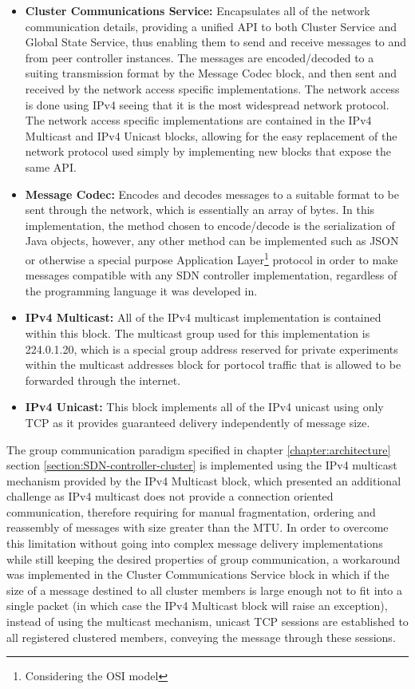 \begin{itemize}
	\item \textbf{Cluster Communications Service:} Encapsulates all of the network communication details, providing a unified \gls{API} to both Cluster Service and Global State Service, thus enabling them to send and receive messages to and from peer controller instances. The messages are encoded/decoded to a suiting transmission format by the Message Codec block, and then sent and received by the network access specific implementations. The network access is done using \gls{IPv4} seeing that it is the most widespread network protocol. The network access specific implementations are contained in the IPv4 Multicast and IPv4 Unicast blocks, allowing for the easy replacement of the network protocol used simply by implementing new blocks that expose the same \gls{API}.
	\item \textbf{Message Codec:} Encodes and decodes messages to a suitable format to be sent through the network, which is essentially an array of bytes. In this implementation, the method chosen to encode/decode is the serialization of Java objects, however, any other method can be implemented such as \gls{JSON} or otherwise a special purpose Application Layer\footnote{Considering the \gls{OSI} model} protocol in order to make messages compatible with any \gls{SDN} controller implementation, regardless of the programming language it was developed in.
	\item \textbf{IPv4 Multicast:} All of the \gls{IPv4} multicast implementation is contained within this block. The multicast group used for this implementation is 224.0.1.20, which is a special group address reserved for private experiments\cite{ReservedMulticastGroups} within the multicast addresses block for portocol traffic that is allowed to be forwarded through the internet\cite{rfc5771}.
	\item \textbf{IPv4 Unicast:} This block implements all of the \gls{IPv4} unicast using only \gls{TCP} as it provides guaranteed delivery independently of message size.
\end{itemize}
%
The group communication paradigm specified in chapter \ref*{chapter:architecture} section \ref{section:SDN-controller-cluster} is implemented using the \gls{IPv4} multicast mechanism provided by the IPv4 Multicast block, which presented an additional challenge as \gls{IPv4} multicast does not provide a connection oriented communication, therefore requiring for manual fragmentation, ordering and reassembly of messages with size greater than the \gls{MTU}.
In order to overcome this limitation without going into complex message delivery implementations while still keeping the desired properties of group communication, a workaround was implemented in the Cluster Communications Service block in which if the size of a message destined to all cluster members is large enough not to fit into a single packet (in which case the IPv4 Multicast block will raise an exception), instead of using the multicast mechanism, unicast \gls{TCP} sessions are established to all registered clustered members, conveying the message through these sessions.
